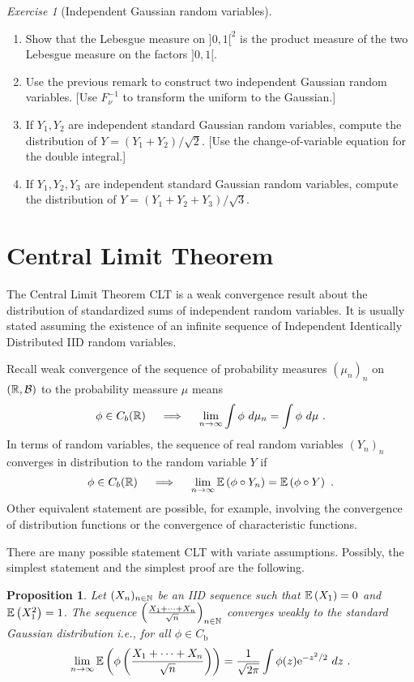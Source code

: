 \documentclass[12pt,a4paper]{amsart}
\theoremstyle{plain}%
\newtheorem{proposition}[thm]{Proposition}
\theoremstyle{definition}
\theoremstyle{remark}
\newtheorem{exercise}{Exercise}
\begin{document}
\begin{exercise}[Independent Gaussian random variables]\ 
  \begin{enumerate}
  \item Show that the Lebesgue measure on $]0,1[^2$ is the product
    measure of the two Lebesgue measure on the factors $]0,1[$.
  \item Use the previous remark to construct two independent Gaussian random variables. [Use $F_\nu^{-1}$ to transform the uniform to the Gaussian.]
  \item If $Y_1,Y_2$ are independent standard Gaussian random variables, compute the distribution of $Y = (Y_1 + Y_2)/\sqrt 2$. [Use the change-of-variable equation for the double integral.]
  \item If $Y_1,Y_2,Y_3$ are independent standard Gaussian random
    variables, compute the distribution of $Y = (Y_1+Y_2+Y_3)/\sqrt 3$.
  \end{enumerate}
\end{exercise}

\section{Central Limit Theorem}
\label{sec:centr-limit-theor}

The Central Limit Theorem CLT is a weak convergence result about the
distribution of standardized sums of independent random variables. It
is usually stated assuming the existence of an infinite sequence of
Independent Identically Distributed IID random variables.

Recall weak convergence of the sequence of probability measures $(\mu_n)_n$ on $(\mathbb{R},\mathcal B)$ to the probability meassure $\mu$ means
\begin{equation*}
  \phi \in C_b(\reals) \quad \implies \quad \lim_{n \to \infty} \int \phi \ d\mu_n = \int \phi \ d\mu \ .
\end{equation*}
In terms of random variables, the sequence of real random variables $(Y_n)_n$ converges in distribution to the random variable $Y$ if
\begin{equation*}
  \phi \in C_b(\mathbb{R}) \quad \implies \quad \lim_{n \to \infty} \operatorname{\mathbb E}\left(\phi\circ Y_n\right) = \operatorname{\mathbb E}\left(\phi\circ Y\right) \ .
\end{equation*}
Other equivalent statement are possible, for example, involving the convergence of distribution functions or the convergence of characteristic functions. 

There are many possible statement CLT with variate
assumptions. Possibly, the simplest statement and the simplest proof are the following.
%
\begin{proposition}Let $(X_n)_{n \in \mathbb{N}}$ be an IID sequence such that $\operatorname{\mathbb E}\left(X_1\right) = 0$ and $\operatorname{\mathbb E}\left(X_1^2\right) = 1$. The sequence $\left(\frac{X_1+\cdots+X_n}{\sqrt n}\right)_{n\in\mathbb{N}}$ converges weakly to the standard Gaussian distribution i.e., for all $\phi \in C_{\text{b}}$
  \begin{equation*}
    \lim_{n \to \infty} \operatorname{\mathbb E}\left(\phi\left(\frac{X_1+\cdots+X_n}{\sqrt n}\right)\right) = \frac1{\sqrt{2\pi}} \int \phi(z) \mathrm{e}^{- z^2/2} \ dz \ .
  \end{equation*}
\end{proposition}
\end{document}
